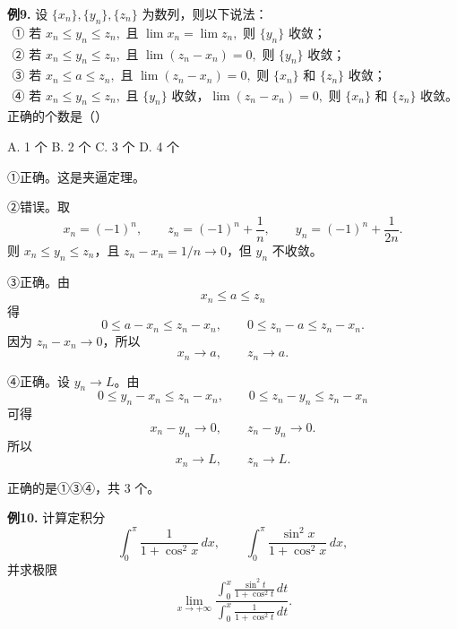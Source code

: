 \begin{problemblock}
\textbf{例9.} 设 \(\{x_n\},\{y_n\},\{z_n\}\) 为数列，则以下说法：
\[
\begin{array}{l}
\text{① 若 }x_n\le y_n\le z_n,\text{ 且 }\lim x_n=\lim z_n,\text{ 则 }\{y_n\}\text{ 收敛；}\\
\text{② 若 }x_n\le y_n\le z_n,\text{ 且 }\lim (z_n-x_n)=0,\text{ 则 }\{y_n\}\text{ 收敛；}\\
\text{③ 若 }x_n\le a\le z_n,\text{ 且 }\lim (z_n-x_n)=0,\text{ 则 }\{x_n\}\text{ 和 }\{z_n\}\text{ 收敛；}\\
\text{④ 若 }x_n\le y_n\le z_n,\text{ 且 }\{y_n\}\text{ 收敛，}\lim (z_n-x_n)=0,\text{ 则 }\{x_n\}\text{ 和 }\{z_n\}\text{ 收敛。}
\end{array}
\]
正确的个数是（\quad）

A. 1 个 \qquad B. 2 个 \qquad C. 3 个 \qquad D. 4 个
\end{problemblock}

\begin{solutionblock}

①正确。这是夹逼定理。

②错误。取
\[
x_n=(-1)^n,\qquad z_n=(-1)^n+\frac1n,\qquad y_n=(-1)^n+\frac1{2n}.
\]
则 \(x_n\le y_n\le z_n\)，且 \(z_n-x_n=1/n\to0\)，但 \(y_n\) 不收敛。

③正确。由
\[
x_n\le a\le z_n
\]
得
\[
0\le a-x_n\le z_n-x_n,\qquad 0\le z_n-a\le z_n-x_n.
\]
因为 \(z_n-x_n\to0\)，所以
\[
x_n\to a,\qquad z_n\to a.
\]

④正确。设 \(y_n\to L\)。由
\[
0\le y_n-x_n\le z_n-x_n,\qquad 0\le z_n-y_n\le z_n-x_n
\]
可得
\[
x_n-y_n\to0,\qquad z_n-y_n\to0.
\]
所以
\[
x_n\to L,\qquad z_n\to L.
\]

正确的是①③④，共 3 个。

\end{solutionblock}

\begin{problemblock}
\textbf{例10.} 计算定积分
\[
\int_0^\pi\frac{1}{1+\cos^2x}\,dx,\qquad
\int_0^\pi\frac{\sin^2x}{1+\cos^2x}\,dx,
\]
并求极限
\[
\lim_{x\to+\infty}
\frac{\displaystyle\int_0^x\frac{\sin^2t}{1+\cos^2t}\,dt}
{\displaystyle\int_0^x\frac{1}{1+\cos^2t}\,dt}.
\]
\end{problemblock}

